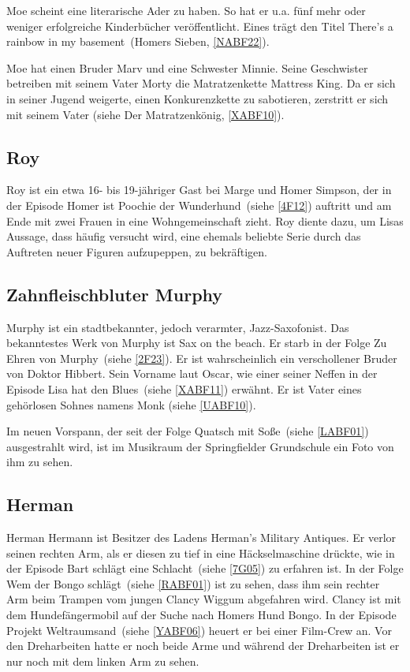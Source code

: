 {Moe scheint eine literarische Ader zu haben. So hat er u.a. fünf mehr oder weniger erfolgreiche Kinderbücher veröffentlicht. Eines trägt den Titel \glqq There's a rainbow in my basement\grqq\ (\glqq Homers Sieben\grqq , \ref{NABF22}).

Moe hat einen Bruder Marv und eine Schwester Minnie. Seine Geschwister betreiben mit seinem Vater Morty die Matratzenkette \glqq Mattress King\grqq. Da er sich in seiner Jugend weigerte, einen Konkurenzkette zu sabotieren, zerstritt er sich mit seinem Vater (siehe \glqq Der Matratzenkönig\grqq, \ref{XABF10}).

\subsection{Roy}
Roy ist ein etwa 16- bis 19-jähriger Gast bei Marge und Homer Simpson, der in der Episode \glqq Homer ist \glq Poochie der Wunderhund\grq \grqq\ (siehe \ref{4F12}) auftritt und am Ende mit zwei Frauen in eine Wohngemeinschaft zieht. Roy diente dazu, um Lisas Aussage, dass häufig versucht wird, eine ehemals beliebte Serie durch das Auftreten neuer Figuren aufzupeppen, zu bekräftigen.

\subsection{Zahnfleischbluter Murphy}\label{ZahnfleischbluterMurphy}
Murphy ist ein stadtbekannter, jedoch verarmter, Jazz-Saxofonist. Das bekanntestes Werk von Murphy ist \glqq Sax on the beach\grqq . Er starb in der Folge \glqq Zu Ehren von Murphy\grqq\ (siehe \ref{2F23}). Er ist wahrscheinlich ein verschollener Bruder von Doktor Hibbert. Sein Vorname laut Oscar, wie einer seiner Neffen in der Episode \glqq Lisa hat den Blues\grqq\ (siehe \ref{XABF11}) erwähnt. Er ist Vater eines gehörlosen Sohnes namens Monk (siehe \ref{UABF10}).

Im neuen Vorspann, der seit der Folge \glqq Quatsch mit Soße\grqq\ (siehe \ref{LABF01}) ausgestrahlt wird, ist im Musikraum der Springfielder Grundschule ein Foto von ihm zu sehen.


\subsection{Herman}\label{HermanHermann}
Herman Hermann ist Besitzer des Ladens \glqq Herman's Military Antiques\grqq . Er verlor seinen rechten Arm, als er diesen zu tief in eine Häckselmaschine drückte, wie in der Episode \glqq Bart schlägt eine Schlacht\grqq\ (siehe \ref{7G05}) zu erfahren ist. In der Folge \glqq Wem der Bongo schlägt\grqq\ (siehe \ref{RABF01}) ist zu sehen, dass ihm sein rechter Arm beim Trampen vom jungen Clancy Wiggum abgefahren wird. Clancy ist mit dem Hundefängermobil auf der Suche nach Homers Hund Bongo. In der Episode \glqq Projekt Weltraumsand\grqq\ (siehe \ref{YABF06}) heuert er bei einer Film-Crew an. Vor den Dreharbeiten hatte er noch beide Arme und während der Dreharbeiten ist er nur noch mit dem linken Arm zu sehen.

}
